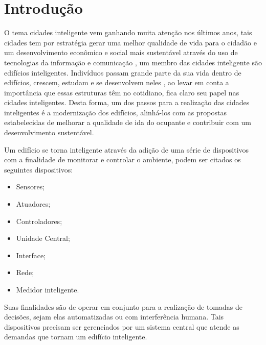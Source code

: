 \chapter{Introdução} 
\label{cap:introducao}



O tema cidades inteligente vem ganhando muita atenção nos últimos anos, tais cidades tem por estratégia gerar uma melhor 
qualidade de vida para o cidadão e um desenvolvimento econômico e social mais sustentável através do uso de tecnologias da 
informação e comunicação \cite{cetic}, um membro das cidades inteligente são edifícios inteligentes. Indivíduos passam grande 
parte da sua vida dentro de edifícios, crescem, estudam e se desenvolvem neles \cite{art1} \cite{noauthor_how_nodate}, ao levar 
em conta a importância que essas estruturas têm no cotidiano, fica claro seu papel nas cidades inteligentes. 
Desta forma, um dos passos para a realização das cidades inteligentes é a modernização dos edifícios, alinhá-los com as propostas
estabelecidas de melhorar a qualidade de ida do ocupante e contribuir com um desenvolvimento sustentável.

Um edifício se torna inteligente através da adição de uma série de dispositivos com a finalidade de monitorar e controlar o ambiente,
podem ser citados os seguintes dispositivos:
\begin{itemize}
    \item Sensores;
    \item Atuadores;
    \item Controladores;
    \item Unidade Central;
    \item Interface;
    \item Rede;
    \item Medidor inteligente.
\end{itemize}
\cite{Morvaj2011} Suas finalidades são de operar em conjunto para a realização de tomadas de decisões, sejam elas automatizadas ou 
com interferência humana.
Tais dispositivos precisam ser gerenciados por um sistema central que atende as demandas que tornam um edifício inteligente. 

